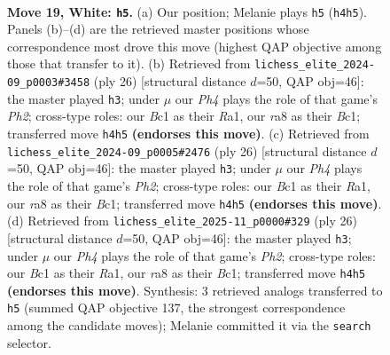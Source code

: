 \documentclass[11pt]{article}
\begin{document}
\clearpage

\begin{figure}[p]\centering
\begin{subfigure}{0.46\textwidth}\centering
\resizebox{\linewidth}{!}{%
\newchessgame
\chessboard[
  setfen={rnb1k2r/pp2b1pp/5p2/3pPp2/5P1P/6P1/P2NN3/R1B1K2R w KQ - 0 19},
  showmover=false,
  pgfstyle=straightmove, color=movearrow, markmove={h4-h5}
]}
\caption{}
\end{subfigure}\hfill
\begin{subfigure}{0.46\textwidth}\centering
\resizebox{\linewidth}{!}{%
\newchessgame
\chessboard[
  setfen={r1b1k2r/ppp2pp1/2p5/4P2p/6Pb/2N2P2/PPP4P/R1BR2K1 w - - 0 14},
  showmover=false,
  pgfstyle=straightmove, color=movearrow, markmove={h2-h3}
]}
\caption{}
\end{subfigure}
\\[4pt]
\begin{subfigure}{0.46\textwidth}\centering
\resizebox{\linewidth}{!}{%
\newchessgame
\chessboard[
  setfen={r1b1k2r/ppp2pp1/2p5/4P2p/6Pb/2N2P2/PPP4P/R1BR2K1 w - - 0 14},
  showmover=false,
  pgfstyle=straightmove, color=movearrow, markmove={h2-h3}
]}
\caption{}
\end{subfigure}\hfill
\begin{subfigure}{0.46\textwidth}\centering
\resizebox{\linewidth}{!}{%
\newchessgame
\chessboard[
  setfen={r1b1k2r/ppp2pp1/2p5/4P2p/6Pb/2N2P2/PPP4P/R1BR2K1 w - - 0 14},
  showmover=false,
  pgfstyle=straightmove, color=movearrow, markmove={h2-h3}
]}
\caption{}
\end{subfigure}
\caption{\textbf{Move 19, White: \texttt{h5}.} (a) Our position; Melanie plays \texttt{h5} (\texttt{h4h5}). Panels (b)--(d) are the retrieved master positions whose correspondence most drove this move (highest QAP objective among those that transfer to it). (b) Retrieved from \texttt{lichess\_elite\_2024-09\_p0003\#3458} (ply 26) [structural distance $d$=50, QAP obj=46]: the master played \texttt{h3}; under $\mu$ our \emph{Ph4} plays the role of that game's \emph{Ph2}; cross-type roles: our \emph{B}c1 as their \emph{R}a1, our \emph{r}a8 as their \emph{B}c1; transferred move \texttt{h4h5} \textbf{(endorses this move)}. (c) Retrieved from \texttt{lichess\_elite\_2024-09\_p0005\#2476} (ply 26) [structural distance $d$=50, QAP obj=46]: the master played \texttt{h3}; under $\mu$ our \emph{Ph4} plays the role of that game's \emph{Ph2}; cross-type roles: our \emph{B}c1 as their \emph{R}a1, our \emph{r}a8 as their \emph{B}c1; transferred move \texttt{h4h5} \textbf{(endorses this move)}. (d) Retrieved from \texttt{lichess\_elite\_2025-11\_p0000\#329} (ply 26) [structural distance $d$=50, QAP obj=46]: the master played \texttt{h3}; under $\mu$ our \emph{Ph4} plays the role of that game's \emph{Ph2}; cross-type roles: our \emph{B}c1 as their \emph{R}a1, our \emph{r}a8 as their \emph{B}c1; transferred move \texttt{h4h5} \textbf{(endorses this move)}. Synthesis: 3 retrieved analogs transferred to \texttt{h5} (summed QAP objective 137, the strongest correspondence among the candidate moves); Melanie committed it via the \texttt{search} selector.}
\label{fig:thought-m36}
\end{figure}
\end{document}
